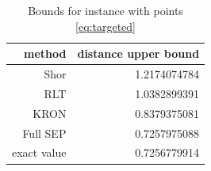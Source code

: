 \documentclass[11pt]{article}
\begin{document}
\begin{table}\caption{Bounds for instance with points \eqref{eq:targeted}}
\label{tab:targeted}
\centering
\vskip 10pt
\begin{tabular}{r|r}
\toprule
method & distance upper bound \\
\midrule
Shor     & 1.2174074784 \\
RLT      & 1.0382899391 \\
KRON     & 0.8379375081 \\
Full SEP & 0.7257975088 \\
\midrule
exact value & 0.7256779914 \\
\bottomrule
\end{tabular}

\end{table}
\end{document}
